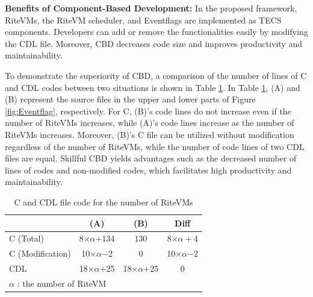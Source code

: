 \documentclass[conference]{IEEEtran/IEEEtran/IEEEtran}
\begin{document}
{\bf Benefits of Component-Based Development:}
In the proposed framework, RiteVMs, the RiteVM scheduler, and Eventflags are implemented as TECS components.
Developers can add or remove the functionalities easily by modifying the CDL file.
Moreover, CBD decreases code size and improves productivity and maintainability.

To demonstrate the superiority of CBD, a comparison of the number of lines of C and CDL codes between two situations is shown in Table \ref{tab:codesize}.
In Table \ref{tab:codesize}, (A) and (B) represent the source files in the upper and lower parts of Figure \ref{fig:Eventflag}, respectively. 
For C, (B)'s code lines do not increase even if the number of RiteVMs increases, while (A)'s code lines increase as the number of RiteVMs increases.
Moreover, (B)'s C file can be utilized without modification regardless of the number of RiteVMs, while the number of code lines of two CDL files are equal.
Skillful CBD yields advantages such as the decreased number of lines of codes and non-modified codes, which facilitates high productivity and maintainability.

\begin{table}[t]
    \centering
    \caption{C and CDL file code for the number of RiteVMs}
    \vspace{-2mm}
    {\tabcolsep=0.3cm
    \begin{tabular}{l||c|c|c}
                & (A)       & (B)     & Diff  \\ \hline
        C (Total)      & 8$\times$$\alpha$$+$134  & 130     & 8$\times$$\alpha+$4\\
        C (Modification)   & 10$\times\alpha$$-$2 & 0   &  10$\times\alpha$$-$2 \\
        CDL    & 18$\times$$\alpha$$+$25   & 18$\times$$\alpha$$+$25 & 0     \\
        \multicolumn{3}{l}{{\small $\alpha$} : {\scriptsize the number of RiteVM}}
        \vspace{-3mm}
    \end{tabular}
    }
          \vspace{-3mm}
    \label{tab:codesize}
\end{table}
\end{document}
